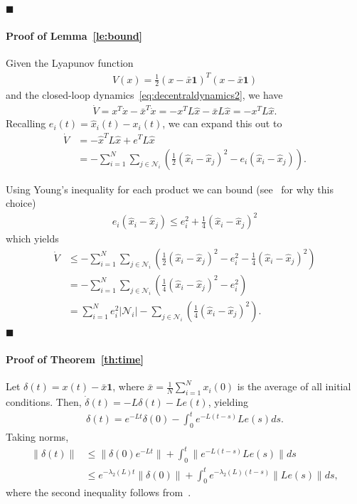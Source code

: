 \documentclass{autart}
\newcommand{\NN}{{\mathcal{N}}}
\newcommand{\TwoNorm}[1]{\|#1\|}
\renewcommand{\hat}{\widehat}
\begin{document}
{\hfill $\blacksquare$

\paragraph*{Proof of Lemma~\ref{le:bound}}
Given the Lyapunov function
\begin{align*}
V(x) = \frac{1}{2} (x - \bar{x} \mathbf{1})^T (x - \bar{x} \mathbf{1})
\end{align*}
and the closed-loop dynamics~\eqref{eq:decentraldynamics2}, we have
\begin{align*}
\dot{V} = x^T \dot{x} - \bar{x}^T \dot{x} = - x^T L
  \hat{x} - \bar{x} L \hat{x} = - x^T L \hat{x}. 
\end{align*}
Recalling $e_i(t) = \hat{x}_i(t) - x_i(t)$, we can expand this out to
\begin{align*}
  \dot{V} &= -\hat{x}^T L \hat{x} + e^T L \hat{x}
  \\
  &= -\sum_{i=1}^N \sum_{j \in \NN_i} \left( \frac{1}{2} (\hat{x}_i -
    \hat{x}_j)^2 - e_i (\hat{x}_i-\hat{x}_j) \right) .
\end{align*}

Using Young's inequality for each product we can bound (see~\cite{CN-JC:16-auto}
for why this choice)
\begin{align*}
  e_i(\hat{x}_i - \hat{x}_j) \leq e_i^2 + \frac{1}{4} (\hat{x}_i -
  \hat{x}_j)^2
\end{align*}
which yields
\begin{align*}
  \dot{V} &\leq -\sum_{i=1}^N \sum_{j \in \NN_i} \left( \frac{1}{2}
    (\hat{x}_i - \hat{x}_j)^2 - e_i^2 - \frac{1}{4} (\hat{x}_i -
    \hat{x}_j)^2 \right)
  \\
  &= - \sum_{i=1}^N \sum_{j \in \NN_i} \left(
    \frac{1}{4}(\hat{x}_i-\hat{x}_j)^2 - e_i^2 \right)
  \\
  &= \sum_{i=1}^N e_i^2 | \NN_i | - \sum_{j \in \NN_i} \left(
    \frac{1}{4}(\hat{x}_i-\hat{x}_j)^2 \right) .
\end{align*}
\hfill $\blacksquare$

\paragraph*{\textbf{Proof of Theorem~\ref{th:time}}}
Let $\delta(t) = x(t) - \bar{x} \mathbf{1}$, where $\bar{x} = \frac{1}{N}
\sum_{i=1}^N x_i(0)$ is the average of all initial conditions. Then,
$\dot{\delta}(t) = - L \delta(t) - L e(t)$, yielding
\begin{align*}
  \delta(t) = e^{-Lt} \delta(0) - \int_0^t e^{-L(t-s)} L e(s) ds .
\end{align*}
Taking norms,
\begin{align*}
  \TwoNorm{\delta(t)} &\leq \TwoNorm{ \delta(0) e^{-Lt}} + \int_0^t
  \TwoNorm{ e^{-L(t-s)} Le(s) } ds
  \\
  &\leq e^{- \lambda_2(L) t} \TwoNorm{\delta(0)} + \int_0^t
  e^{-\lambda_2(L)(t-s)} \TwoNorm{L e(s)} ds, 
\end{align*}
where the second inequality follows from~\cite[Lemma 2.1]{GSS-DVD-KHJ:13}.

}
\end{document}
